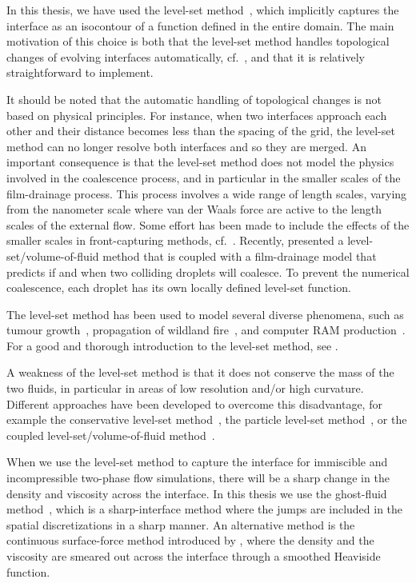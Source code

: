\documentclass[11pt,b5paper,DIV=calc,BCOR1.3cm,headings=small,%
               footinclude=false,headsepline]{scrbook}
\begin{document}
In this thesis, we have used the level-set method~\cite{Osher88}, which
implicitly captures the interface as an isocontour of a function defined in the
entire domain.  The main motivation of this choice is both that the level-set
method handles topological changes of evolving interfaces automatically,
cf.~\citet{Sethian03}, and that it is relatively straightforward to implement.

It should be noted that the automatic handling of topological changes is not
based on physical principles.  For instance, when two interfaces approach each
other and their distance becomes less than the spacing of the grid, the
level-set method can no longer resolve both interfaces and so they are merged.
An important consequence is that the level-set method does not model the
physics involved in the coalescence process, and in particular in the smaller
scales of the film-drainage process.  This process involves a wide range of
length scales, varying from the nanometer scale where van der Waals force are
active to the length scales of the external flow.  Some effort has been made to
include the effects of the smaller scales in front-capturing methods,
cf.~\cite{Nobari96,Tryggvason10}.  Recently, \citet{Kwakkel13} presented
a level-set/volume-of-fluid method that is coupled with a film-drainage model
that predicts if and when two colliding droplets will coalesce.  To prevent the
numerical coalescence, each droplet has its own locally defined level-set
function.

The level-set method has been used to model several diverse phenomena,
such as tumour growth~\cite{Macklin06,Macklin05,Macklin08}, propagation of
wildland fire~\cite{Mallet09}, and computer RAM production~\cite{Melicher08}.
For a good and thorough introduction to the level-set method, see
\cite{Osher03}.

A weakness of the level-set method is that it does not conserve the mass of the
two fluids, in particular in areas of low resolution and/or high curvature.
Different approaches have been developed to overcome this disadvantage, for
example the conservative level-set method~\cite{Olsson05,Olsson07}, the
particle level-set method~\cite{Enright02}, or the coupled
level-set/volume-of-fluid method~\cite{Sussman00}.

When we use the level-set method to capture the interface for immiscible and
incompressible two-phase flow simulations, there will be a sharp change in the
density and viscosity across the interface.  In this thesis we use the
ghost-fluid method~\cite{Fedkiw99}, which is a sharp-interface method where the
jumps are included in the spatial discretizations in a sharp manner.  An
alternative method is the continuous surface-force method introduced by
\citet{Brackbill92}, where the density and the viscosity are smeared out across
the interface through a smoothed Heaviside function.
\end{document}
